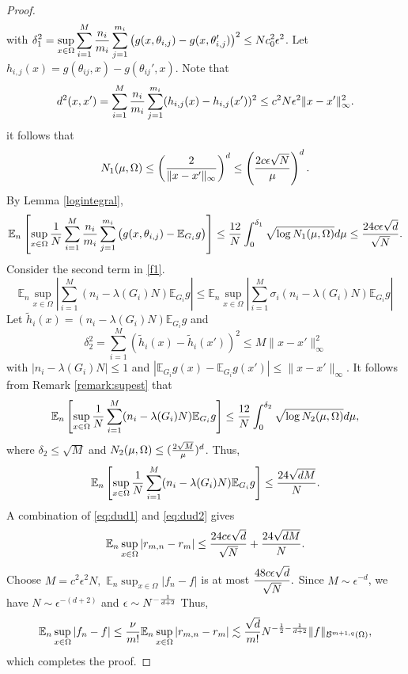 \begin{proof}
\begin{align}
\end{align} 
with $\displaystyle \delta_1^2=\sup_{x\in \Omega} \sum_{i=1}^M {n_i\over m_i} \sum_{j=1}^{m_i} \big (g(x,\theta_{i,j}) - g(x,\theta_{i,j}')\big )^2\le Nc_0^2\epsilon^2$. Let $h_{i, j}(x)= g(\theta_{ij}, x) - g(\theta_{ij}', x)$. Note that
\begin{align}
d^2(x, x') = \sum_{i=1}^M {n_i\over m_i} \sum_{j=1}^{m_i}(h_{i, j}(x) - h_{i, j}(x'))^2
 \le c^2N\epsilon^2  \|x -x'\|_\infty^2.
\end{align}
it follows that
\begin{align} %
N_1(\mu, \Omega) \le \left ( {2\over \|x -x'\|_\infty} \right)^d
\le \left ( {2c\epsilon\sqrt{N} \over \mu}\right)^d.
\end{align}
By Lemma \ref{logintegral},
\begin{align}  
\mathbb{E}_n \left[ \sup_{x\in \Omega}{1\over N}\sum_{i=1}^M {n_i\over m_i} \sum_{j=1}^{m_i} \big (g(x,\theta_{i,j}) - \mathbb{E}_{G_i}g \big )\right] \le {12\over N}\int_0^{\delta_1} \sqrt{\log N_1(\mu, \Omega)}d\mu
\le {24c\epsilon \sqrt{d}\over \sqrt{N}}.\label{eq:dud1}
\end{align} 
Consider the second term in \eqref{f1}.
$$
\mathbb{E}_n\sup_{x\in \Omega}\left |\sum_{i=1}^M (n_i - \lambda(G_i)N)  \mathbb{E}_{G_i}g \right |\le \mathbb{E}_n\sup_{x\in \Omega}\left |\sum_{i=1}^M \sigma_i(n_i - \lambda(G_i)N)  \mathbb{E}_{G_i}g \right |
$$
Let $\tilde h_i(x) =(n_i - \lambda(G_i)N)  \mathbb{E}_{G_i}g$ and 
$$
\delta_2^2 = \sum_{i=1}^M (\tilde h_i(x) - \tilde h_i(x'))^2\le M\|x-x'\|_\infty^2
$$
with $|n_i - \lambda(G_i)N|\le 1$ and $|\mathbb{E}_{G_i}g(x) - \mathbb{E}_{G_i}g(x')|\le \|x-x'\|_\infty$. It follows from Remark \eqref{remark:supest} that
$$
\mathbb{E}_n\left [\sup_{x\in \Omega}{1\over N}\sum_{i=1}^M (n_i - \lambda(G_i)N)  \mathbb{E}_{G_i}g\right ]\le  {12\over N}\int_0^{\delta_2} \sqrt{\log N_2(\mu, \Omega)}d\mu,
$$
where $\delta_2\le \sqrt{M}$ and $N_2(\mu, \Omega)\le ({2\sqrt{M}\over \mu})^d$. Thus,
\begin{align} 
\mathbb{E}_n\left [\sup_{x\in \Omega}{1\over N}\sum_{i=1}^M (n_i - \lambda(G_i)N)  \mathbb{E}_{G_i}g\right ]\le  {24\sqrt{dM}\over N}.\label{eq:dud2}
\end{align}
A combination of \eqref{eq:dud1} and \eqref{eq:dud2} gives
\begin{align} 
\mathbb{E}_n\sup_{x\in \Omega} |r_{m,n} - r_m |\le {24c\epsilon \sqrt{d}\over \sqrt{N}} + {24\sqrt{dM}\over N}.
\end{align}
Choose
$
\displaystyle M= c^2\epsilon^2 N,
$
$\displaystyle \mathbb{E}_n\sup_{x\in \Omega} |f_n - f |$ is at most
$
\displaystyle {48c\epsilon \sqrt{d}\over \sqrt{N}}.
$
Since $M \sim \epsilon^{-d}$,  we have
$
N\sim \epsilon^{-(d+2)}
$
and 
$
\epsilon\sim N^{-{1\over d+2}}
$
Thus,
\begin{align} 
\mathbb{E}_n\sup_{x\in \Omega} |f_n - f |\le {\nu\over m!}\mathbb{E}_n\sup_{x\in \Omega} |r_{m,n} - r_m| \lesssim {\sqrt{d} \over m!}N^{-{1\over 2}-{1\over d+2}}\|f\|_{\mathcal B^{m+1, q}(\Omega)},
\end{align}
which completes the proof. 
\end{proof}
